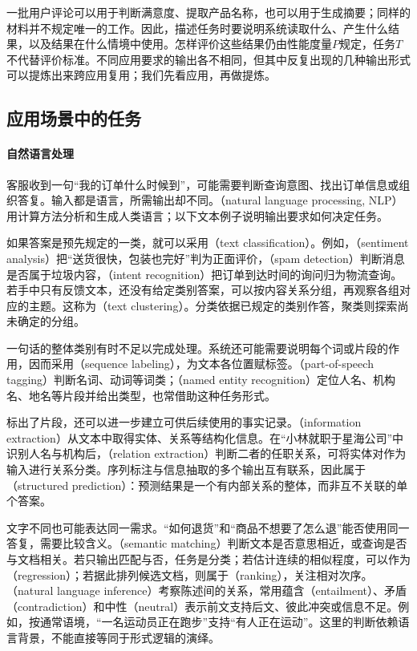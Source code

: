 一批用户评论可以用于判断满意度、提取产品名称，也可以用于生成摘要；同样的材料并不规定唯一的工作。因此，描述任务时要说明系统读取什么、产生什么结果，以及结果在什么情境中使用。怎样评价这些结果仍由性能度量$P$规定，任务$T$不代替评价标准。不同应用要求的输出各不相同，但其中反复出现的几种输出形式可以提炼出来跨应用复用；我们先看应用，再做提炼。

\subsection{应用场景中的任务}

\paragraph{自然语言处理}
客服收到一句“我的订单什么时候到”，可能需要判断查询意图、找出订单信息或组织答复。输入都是语言，所需输出却不同。（natural language processing, NLP）用计算方法分析和生成人类语言；以下文本例子说明输出要求如何决定任务。

如果答案是预先规定的一类，就可以采用（text classification）。例如，（sentiment analysis）把“送货很快，包装也完好”判为正面评价，（spam detection）判断消息是否属于垃圾内容，（intent recognition）把订单到达时间的询问归为物流查询。若手中只有反馈文本，还没有给定类别答案，可以按内容关系分组，再观察各组对应的主题。这称为（text clustering）。分类依据已规定的类别作答，聚类则探索尚未确定的分组。

一句话的整体类别有时不足以完成处理。系统还可能需要说明每个词或片段的作用，因而采用（sequence labeling），为文本各位置赋标签。（part-of-speech tagging）判断名词、动词等词类；（named entity recognition）定位人名、机构名、地名等片段并给出类型，也常借助这种任务形式。

标出了片段，还可以进一步建立可供后续使用的事实记录。（information extraction）从文本中取得实体、关系等结构化信息。在“小林就职于星海公司”中识别人名与机构后，（relation extraction）判断二者的任职关系，可将实体对作为输入进行关系分类。序列标注与信息抽取的多个输出互有联系，因此属于（structured prediction）：预测结果是一个有内部关系的整体，而非互不关联的单个答案。

文字不同也可能表达同一需求。“如何退货”和“商品不想要了怎么退”能否使用同一答复，需要比较含义。（semantic matching）判断文本是否意思相近，或查询是否与文档相关。若只输出匹配与否，任务是分类；若估计连续的相似程度，可以作为（regression）；若据此排列候选文档，则属于（ranking），关注相对次序。（natural language inference）考察陈述间的关系，常用蕴含（entailment）、矛盾（contradiction）和中性（neutral）表示前文支持后文、彼此冲突或信息不足。例如，按通常语境，“一名运动员正在跑步”支持“有人正在运动”。这里的判断依赖语言背景，不能直接等同于形式逻辑的演绎。

